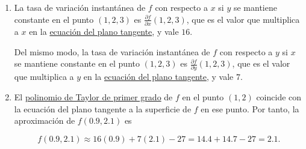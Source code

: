 \documentclass[
  a4paper,
]{scrreport}
\theoremstyle{definition}
\theoremstyle{remark}
\begin{document}
\begin{tcolorbox}
\begin{enumerate}
  Por tanto, la ecuación del plano tangente es

  \[
  (x-1, y-2, z-3) \cdot (32, 14, -2) = 0 
  \Leftrightarrow 32(x-1) + 14(y-2) - 2(z-3) = 0
  \Leftrightarrow 32(x-1) + 12(y-2) + 30(z-3) = 0
  \Leftrightarrow z = 16x + 7y - 27.
  \]
\item
  La tasa de variación instantánea de \(f\) con respecto a \(x\) si
  \(y\) se mantiene constante en el punto \((1,2,3)\) es
  \(\frac{\partial f}{\partial x}(1,2,3)\), que es el valor que
  multiplica a \(x\) en la
  \href{https://aprendeconalf.es/analisis-manual/13-derivadas-funciones-varias-variables.html\#def-plano-tangente-superficie}{ecuación
  del plano tangente}, y vale \(16\).

  Del mismo modo, la tasa de variación instantánea de \(f\) con respecto
  a \(y\) si \(x\) se mantiene constante en el punto \((1,2,3)\) es
  \(\frac{\partial f}{\partial y}(1,2,3)\), que es el valor que
  multiplica a \(y\) en la
  \href{https://aprendeconalf.es/analisis-manual/13-derivadas-funciones-varias-variables.html\#def-plano-tangente-superficie}{ecuación
  del plano tangente}, y vale \(7\).
\item
  El
  \href{https://aprendeconalf.es/analisis-manual/13-derivadas-funciones-varias-variables.html\#aproximaci\%C3\%B3n-lineal-de-una-funci\%C3\%B3n-de-varias-variables}{polinomio
  de Taylor de primer grado} de \(f\) en el punto \((1,2)\) coincide con
  la ecuación del plano tangente a la superficie de \(f\) en ese punto.
  Por tanto, la aproximación de \(f(0.9, 2.1)\) es

  \[
  f(0.9, 2.1) \approx 16(0.9) + 7(2.1) - 27 = 14.4 + 14.7 - 27 = 2.1.
  \]
\end{enumerate}

\end{tcolorbox}
\end{document}
